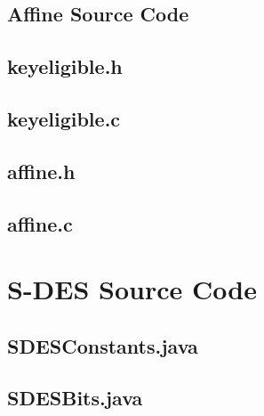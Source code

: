 \documentclass[]{article}
\begin{document}
\pagebreak


\vspace*{-0.8cm}
\begin{center}
	\section*{Affine Source Code}
\end{center}

\subsection*{keyeligible.h}
\pagebreak{}
\subsection*{keyeligible.c}
\pagebreak{}
\subsection*{affine.h}
\pagebreak{}
\subsection*{affine.c}
\pagebreak{}


\vspace*{-0.8cm}
	\section*{S-DES Source Code}

\subsection*{SDESConstants.java}
\pagebreak{}
\subsection*{SDESBits.java}
\pagebreak{}
\end{document}

